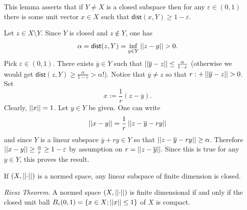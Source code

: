 \documentclass{article}
\begin{document}
\begin{remark}
	This lemma asserts that if $Y\neq X$ is a closed subspace then for any $\varepsilon\in(0,1)$ there is some unit vector $x\in X$ such that $\mathsf{dist}(x,Y)\geq 1-\varepsilon$.
\end{remark}
\begin{fancyproof}
	Let $z\in X\setminus Y$. Since $Y$ is closed and $z\notin Y$, one has
	\begin{equation*}
		\alpha=\mathsf{dist}(z,Y)=\inf_{y\in Y}\norm{z-y}>0.
	\end{equation*}
	Pick $\varepsilon\in(0,1)$. There exists $\overline{y}\in Y$ such that $\left|\left|\overline{y}-z\right|\right|\leq\frac{\alpha}{1-\varepsilon}$ (otherwise we would get $\mathsf{dist}(z,Y)\geq\frac{\alpha}{1-\varepsilon}>\alpha$!). Notice that $\overline{y}\neq z$ so that $r:+\norm{\overline{y}-z}>0$. Set 
	\begin{equation*}
		x:=\frac{1}{r}(z-\overline{y}).
	\end{equation*}
	Clearly, $\left|\left|x\right|\right|=1$. Let $y\in Y$ be given. One can write
	\begin{equation*}
		\left|\left|x-y\right|\right|=\frac{1}{r}\left|\left|z-\overline{y}-ry\right|\right|
	\end{equation*}
	and since $Y$ is a linear subspace $\overline{y}+ry\in Y$ so that $\left|\left|z-\overline{y}-ry\right|\right|\geq \alpha$. Therefore $\left|\left|x-y\right|\right|\geq\frac{\alpha}{r}\geq 1-\varepsilon$ by assumption on $r=\left|\left|z-\overline{y}\right|\right|$. Since this is true for any $y\in Y$, this proves the result.
\end{fancyproof}
\begin{lemma}
	If $\left(X,\left|\left|\cdot\right|\right|\right)$ is a normed space, any linear subspace of finite dimension is closed. 
\end{lemma}
\begin{theorem}
	\emph{Riesz Theorem}. A normed space $\left(X,\left|\left|\cdot\right|\right|\right)$ is finite dimensional if and only if the closed unit ball $B_{c}(0,1)=\left\{x\in X;\left|\left|x\right|\right|\leq 1\right\}$ of $X$ is compact.
\end{theorem}
\end{document}
